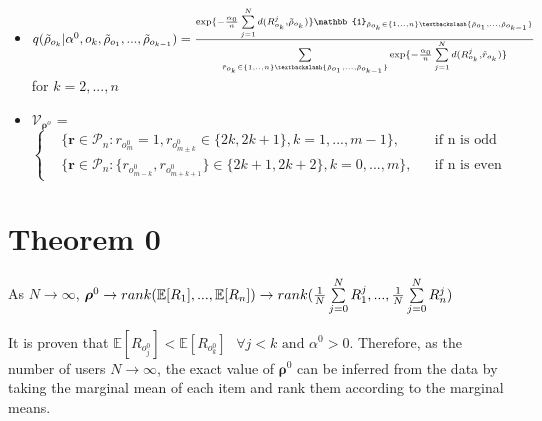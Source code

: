 \documentclass[11pt, oneside]{article}   	%
\begin{document}
\begin{itemize}
	\item{
		$ {q(\tilde{\rho}_{o_k}|\alpha^0, o_k, \tilde{\rho}_{o_1}, ..., \tilde{\rho}_{o_{k-1}}) }
		= \frac{\text{exp}\{- \frac{\alpha_0}{n}\sum\limits_{j=1}^{N}d(R^j_{o_k}, \tilde{\rho}_{o_k})\}\mathbb{1}_{\tilde{\rho}_{o_k}\in\{1, .., n\}\textbackslash \{\tilde{\rho}_{o_1}, ..., \tilde{\rho}_{o_{k-1}}\}}}
		{\sum\limits_{\tilde{r}_{o_k}\in \{1, .., n\}\textbackslash \{\tilde{\rho}_{o_1}, ..., \tilde{\rho}_{o_{k-1}}\}}\text{exp}\{- \frac{\alpha_0}{n}\sum\limits_{j=1}^{N}d(R^j_{o_k}, \tilde{r}_{o_k})\}} $} for $k = 2, ..., n$
	
	\item{ $\mathcal{V}_{\bm{\rho}^o}$ = $
		\left \{ 
		\begin{aligned}
		&\{\bm{r}\in \mathcal{P}_n: r_{o^0_m}=1, r_{o^0_{m\pm k}} \in \{2k, 2k+1 \}, k = 1, ..., m-1 \}, && \text{if n is odd} \\
		&\{\bm{r}\in \mathcal{P}_n: \{r_{o^0_{m-k}},r_{o^0_{m+k+1}} \} \in \{2k+1, 2k+2 \}, k = 0, ..., m \}, && \text{if n is even} 
		\end{aligned} \right.
		$
	}

\end{itemize}

\section{Theorem 0}
As $N \rightarrow \infty$, $\bm{\rho}^0 \rightarrow rank(\mathbb{E}[{R}_1],...,\mathbb{E}[{R}_n]) \rightarrow rank({1\over N}\sum\limits_{j=0}^{N}R_1^j,...,{1\over N}\sum\limits_{j=0}^{N}R_n^j)$

It is proven that $\mathbb{E}[R_{o^0_j}] < \mathbb{E}[R_{o^0_k}] \text{ }\forall j<k \text{ and } \alpha^0 >0 $. Therefore, as the number of users $N \rightarrow \infty$, the exact value of $\bm{\rho}^0$ can be inferred from the data by taking the marginal mean of each item and rank them according to the marginal means.
\end{document}
